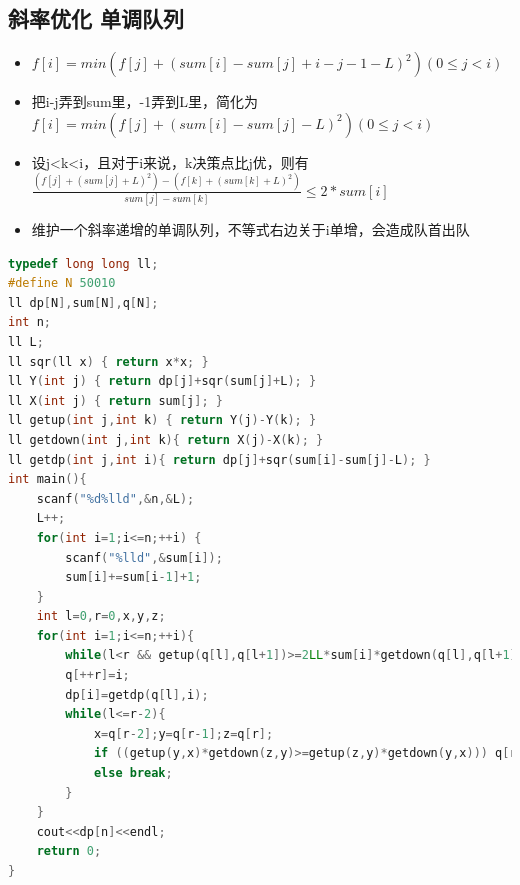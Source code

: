 \documentclass[UTF8,a4paper,titlepage]{ctexart}
\begin{document}
\subsection{斜率优化 单调队列}
\begin{itemize}
	\item $f[i]=min(f[j]+(sum[i]-sum[j]+i-j-1-L)^2) (0\le j<i)$
	\item 把i-j弄到sum里，-1弄到L里，简化为$f[i]=min(f[j]+(sum[i]-sum[j]-L)^2) (0\le j<i)$
	\item 设j<k<i，且对于i来说，k决策点比j优，则有$\frac{(f[j]+(sum[j]+L)^2)-(f[k]+(sum[k]+L)^2)}{sum[j]-sum[k]} \le 2*sum[i]$
	\item 维护一个斜率递增的单调队列，不等式右边关于i单增，会造成队首出队
\end{itemize}
\begin{lstlisting}[language=C++]
typedef long long ll;
#define N 50010
ll dp[N],sum[N],q[N];
int n;
ll L;
ll sqr(ll x) { return x*x; }
ll Y(int j) { return dp[j]+sqr(sum[j]+L); }
ll X(int j) { return sum[j]; }
ll getup(int j,int k) { return Y(j)-Y(k); }
ll getdown(int j,int k){ return X(j)-X(k); }
ll getdp(int j,int i){ return dp[j]+sqr(sum[i]-sum[j]-L); }
int main(){
    scanf("%d%lld",&n,&L);
    L++;
    for(int i=1;i<=n;++i) {
        scanf("%lld",&sum[i]);
        sum[i]+=sum[i-1]+1;
    }
    int l=0,r=0,x,y,z;
    for(int i=1;i<=n;++i){
        while(l<r && getup(q[l],q[l+1])>=2LL*sum[i]*getdown(q[l],q[l+1])) l++;
        q[++r]=i;
        dp[i]=getdp(q[l],i);
        while(l<=r-2){
            x=q[r-2];y=q[r-1];z=q[r];
            if ((getup(y,x)*getdown(z,y)>=getup(z,y)*getdown(y,x))) q[r-1]=q[r],--r;
            else break;
        }
    }
    cout<<dp[n]<<endl;
    return 0;
}

      \end{lstlisting}
\end{document}
